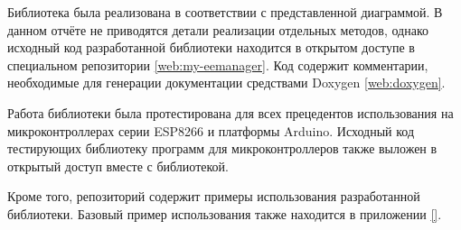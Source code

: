 
Библиотека была реализована в соответствии с представленной диаграммой.
В данном отчёте не приводятся детали реализации отдельных методов, однако исходный код разработанной библиотеки находится в открытом доступе в специальном репозитории \ref{web:my-eemanager}.
Код содержит комментарии, необходимые для генерации документации средствами Doxygen \ref{web:doxygen}.

Работа библиотеки была протестирована для всех прецедентов использования на микроконтроллерах серии ESP8266 и платформы Arduino.
Исходный код тестирующих библиотеку программ для микроконтроллеров также выложен в открытый доступ вместе с библиотекой.

Кроме того, репозиторий содержит примеры использования разработанной библиотеки.
Базовый пример использования также находится в приложении \ref{}.
